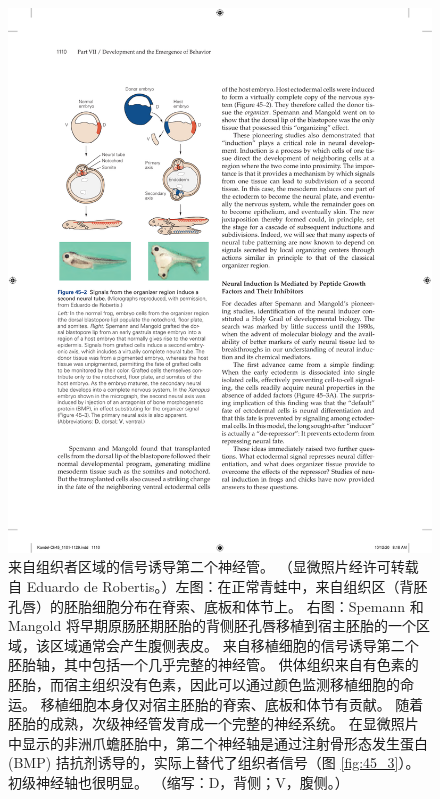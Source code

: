 \begin{figure}[htbp]
	\centering
	\includegraphics[width=0.5\linewidth]{chap45/fig_45_2}
	\caption{来自组织者区域的信号诱导第二个神经管。 （显微照片经许可转载自 Eduardo de Robertis。）左图：在正常青蛙中，来自组织区（背胚孔唇）的胚胎细胞分布在脊索、底板和体节上。 右图：Spemann 和 Mangold 将早期原肠胚期胚胎的背侧胚孔唇移植到宿主胚胎的一个区域，该区域通常会产生腹侧表皮。 来自移植细胞的信号诱导第二个胚胎轴，其中包括一个几乎完整的神经管。 供体组织来自有色素的胚胎，而宿主组织没有色素，因此可以通过颜色监测移植细胞的命运。 移植细胞本身仅对宿主胚胎的脊索、底板和体节有贡献。 随着胚胎的成熟，次级神经管发育成一个完整的神经系统。 在显微照片中显示的非洲爪蟾胚胎中，第二个神经轴是通过注射骨形态发生蛋白 (BMP) 拮抗剂诱导的，实际上替代了组织者信号（图 \ref{fig:45_3}）。 初级神经轴也很明显。 （缩写：D，背侧；V，腹侧。）}
	\label{fig:45_2}
\end{figure}


